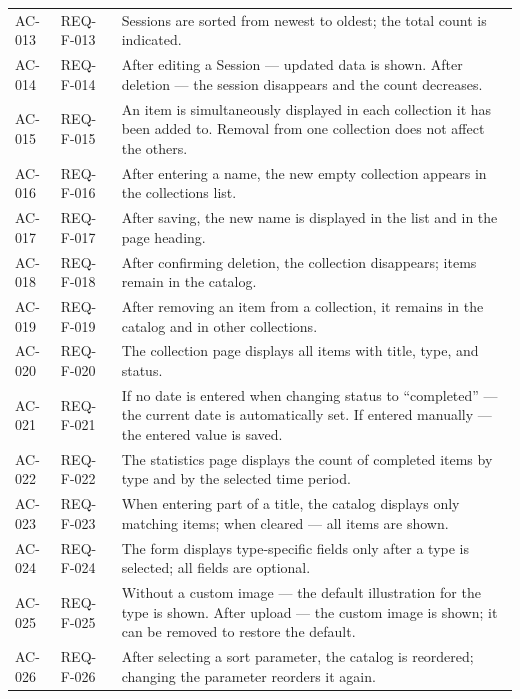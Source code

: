 \begin{longtable}{L{2cm} L{2.5cm} L{9.5cm}}
\addlinespace
AC-013 & REQ-F-013 & Sessions are sorted from newest to oldest; the total count is indicated.  \\
\addlinespace
AC-014 & REQ-F-014 & After editing a Session --- updated data is shown. After deletion --- the session disappears and the count decreases.  \\
\addlinespace
AC-015 & REQ-F-015 & An item is simultaneously displayed in each collection it has been added to. Removal from one collection does not affect the others.  \\
\addlinespace
AC-016 & REQ-F-016 & After entering a name, the new empty collection appears in the collections list.  \\
\addlinespace
AC-017 & REQ-F-017 & After saving, the new name is displayed in the list and in the page heading.  \\
\addlinespace
AC-018 & REQ-F-018 & After confirming deletion, the collection disappears; items remain in the catalog.  \\
\addlinespace
AC-019 & REQ-F-019 & After removing an item from a collection, it remains in the catalog and in other collections.  \\
\addlinespace
AC-020 & REQ-F-020 & The collection page displays all items with title, type, and status.  \\
\addlinespace
AC-021 & REQ-F-021 & If no date is entered when changing status to ``completed'' --- the current date is automatically set. If entered manually --- the entered value is saved.  \\
\addlinespace
AC-022 & REQ-F-022 & The statistics page displays the count of completed items by type and by the selected time period.  \\
\addlinespace
AC-023 & REQ-F-023 & When entering part of a title, the catalog displays only matching items; when cleared --- all items are shown.  \\
\addlinespace
AC-024 & REQ-F-024 & The form displays type-specific fields only after a type is selected; all fields are optional.  \\
\addlinespace
AC-025 & REQ-F-025 & Without a custom image --- the default illustration for the type is shown. After upload --- the custom image is shown; it can be removed to restore the default.  \\
\addlinespace
AC-026 & REQ-F-026 & After selecting a sort parameter, the catalog is reordered; changing the parameter reorders it again.  \\

\end{longtable}
